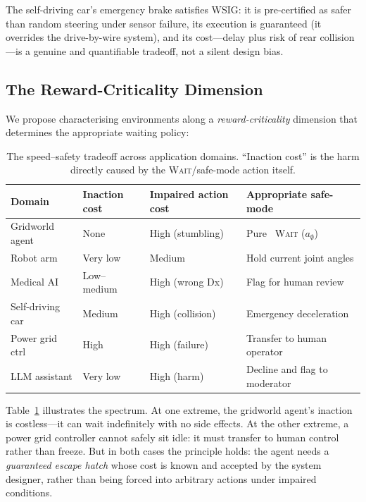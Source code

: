 \documentclass[manuscript, screen, review]{jair}
\begin{document}
The self-driving car's emergency brake satisfies WSIG: it is pre-certified
as safer than random steering under sensor failure, its execution is
guaranteed (it overrides the drive-by-wire system), and its cost---delay
plus risk of rear collision---is a genuine and quantifiable tradeoff, not
a silent design bias.

\subsection{The Reward-Criticality Dimension}

We propose characterising environments along a \emph{reward-criticality}
dimension that determines the appropriate waiting policy:

\begin{table}[t]
\centering
\caption{The speed--safety tradeoff across application domains.
``Inaction cost'' is the harm directly caused by the 
\textsc{Wait}/safe-mode action itself.}
\label{tab:tradeoff}
\begin{tabular}{lll p{4.5cm}}
\toprule
\textbf{Domain} & \textbf{Inaction cost} & \textbf{Impaired action cost} & \textbf{Appropriate safe-mode} \\
\midrule
Gridworld agent & None       & High (stumbling)  & Pure \ \textsc{Wait} ($a_\emptyset$) \\
Robot arm       & Very low   & Medium            & Hold current joint angles \\
Medical AI      & Low--medium & High (wrong Dx)  & Flag for human review \\
Self-driving car & Medium    & High (collision)  & Emergency deceleration \\
Power grid ctrl & High       & High (failure)    & Transfer to human operator \\
LLM assistant   & Very low   & High (harm)       & Decline and flag to moderator \\
\bottomrule
\end{tabular}
\end{table}

Table~\ref{tab:tradeoff} illustrates the spectrum.
At one extreme, the gridworld agent's inaction is costless---it can wait
indefinitely with no side effects.
At the other extreme, a power grid controller cannot safely sit idle: it
must transfer to human control rather than freeze.
But in both cases the principle holds: the agent needs a \emph{guaranteed
escape hatch} whose cost is known and accepted by the system designer,
rather than being forced into arbitrary actions under impaired conditions.
\end{document}
